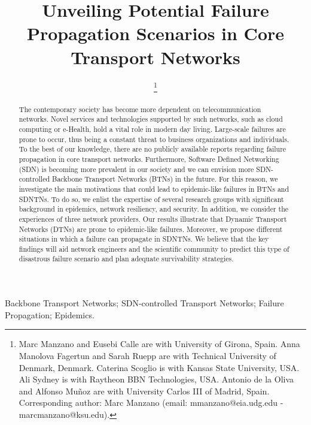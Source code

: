 \documentclass[10pt,draftclsnofoot,onecolumn,journal]{IEEEtran}
\begin{document}
\title{Unveiling Potential Failure Propagation Scenarios in Core Transport Networks}


\author{\thanks{Marc Manzano and Eusebi Calle are with University of Girona, Spain. Anna Manolova Fagertun and Sarah Ruepp are with Technical University of Denmark, Denmark. Caterina Scoglio is with Kansas State University, USA. Ali Sydney is with Raytheon BBN Technologies, USA. Antonio de la Oliva and Alfonso Mu\~{n}oz are with University Carlos III of Madrid, Spain. Corresponding author: Marc Manzano (email: mmanzano@eia.udg.edu - marcmanzano@ksu.edu).}}

\maketitle \thispagestyle{plain}

\begin{abstract}
The contemporary society has become more dependent on telecommunication networks. Novel services and technologies supported by such networks, such as cloud computing or e-Health, hold a vital role in modern day living. Large-scale failures are prone to occur, thus being a constant threat to business organizations and individuals. To the best of our knowledge, there are no publicly available reports regarding failure propagation in core transport networks. Furthermore, Software Defined Networking (SDN) is becoming more prevalent in our society and we can envision more SDN-controlled Backbone Transport Networks (BTNs) in the future. For this reason, we investigate the main motivations that could lead to epidemic-like failures in BTNs and SDNTNs. To do so, we enlist the expertise of several research groups with significant background in epidemics, network resiliency, and security. In addition, we consider the experiences of three network providers. Our results illustrate that Dynamic Transport Networks (DTNs) are prone to epidemic-like failures. Moreover, we propose different situations in which a failure can propagate in SDNTNs. We believe that the key findings will aid network engineers and the scientific community to predict this type of disastrous failure scenario and plan adequate survivability strategies.
\end{abstract}

\begin{IEEEkeywords}
Backbone Transport Networks; SDN-controlled Transport Networks; Failure Propagation; Epidemics.
\end{IEEEkeywords}
\end{document}
